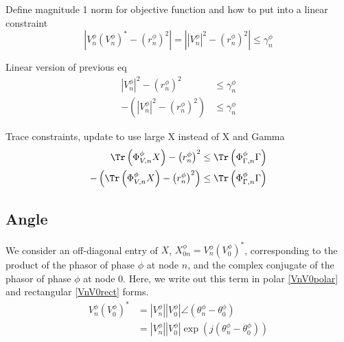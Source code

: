 Define magnitude 1 norm for objective function and how to put into a linear constraint
\begin{equation}
	\left| V_{n}^{\phi} \left( V_{n}^{\phi} \right)^{*} - \left( r_{n}^{\phi} \right)^{2} \right|
    =
	\left| \left| V_{n}^{\phi} \right|^{2} - \left( r_{n}^{\phi} \right)^{2} \right| \leq \gamma_{n}^{\phi}
\end{equation}

Linear version of previous eq
\begin{align}
	\left| V_{n}^{\phi} \right|^{2} - \left( r_{n}^{\phi} \right)^{2} & \leq \gamma_{n}^{\phi} \\
    - \left( \left| V_{n}^{\phi} \right|^{2} - \left( r_{n}^{\phi} \right)^{2} \right) & \leq \gamma_{n}^{\phi}
\end{align}

Trace constraints, update to use large X instead of X and Gamma
\begin{align}
	\Tr \left( \Phi_{V,n}^{\phi} X \right) - \left( r_{n}^{\phi} \right)^{2} & \leq \Tr \left( \Phi_{\Gamma,n}^{\phi} \Gamma \right) \\
    - \left( \Tr \left( \Phi_{V,n}^{\phi} X \right) - \left( r_{n}^{\phi} \right)^{2} \right) & \leq \Tr \left( \Phi_{\Gamma,n}^{\phi} \Gamma \right)
\end{align}

\subsection{Angle}

We consider an off-diagonal entry of $X$, $X_{0n}^{\phi} = V_{n}^{\phi} \left( V_{0}^{\phi} \right)^{*}$, corresponding to the product of the phasor of phase $\phi$ at node $n$, and the complex conjugate of the phasor of phase $\phi$ at node 0. Here, we write out this term in polar \eqref{VnV0polar} and rectangular \eqref{VnV0rect} forms.
\begin{align}
	V_{n}^{\phi} \left( V_{0}^{\phi} \right)^{*} &= \left| V_{n}^{\phi} \right| \left| V_{0}^{\phi} \right| \angle \left( \theta_{n}^{\phi} - \theta_{0}^{\phi} \right) \label{VnV0polar} \\
    &= \left| V_{n}^{\phi} \right| \left| V_{0}^{\phi} \right| \exp \left( j \left( \theta_{n}^{\phi} - \theta_{0}^{\phi} \right) \right) \label{VnV0rect} 
\end{align}

